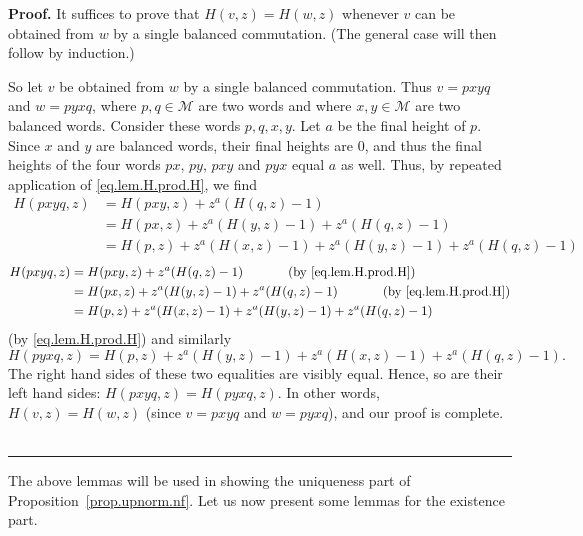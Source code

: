 \documentclass[numbers=enddot,12pt,final,onecolumn,notitlepage]{scrartcl}%
\theoremstyle{definition}
\newenvironment{proof}[1][Proof]{\noindent\textbf{#1.} }{\ \rule{0.5em}{0.5em}}
\newcommand{\M}{\mathcal{M}}
\newenvironment{verlong}{}{}
\newenvironment{vershort}{}{}
\begin{document}
\begin{proof}
It suffices to prove that $H(v, z) = H(w, z)$ whenever $v$ can be obtained from $w$ by a single balanced commutation.
(The general case will then follow by induction.)

So let $v$ be obtained from $w$ by a single balanced commutation.
Thus $v=pxyq$ and $w=pyxq$, where $p,q\in\M$ are two words and where $x,y\in\M$ are two balanced words.
Consider these words $p,q,x,y$.
Let $a$ be the final height of $p$. Since $x$ and $y$ are balanced words, their final heights are $0$, and thus the final heights of the four words $px$, $py$, $pxy$ and $pyx$ equal $a$ as well.
Thus, by repeated application of \eqref{eq.lem.H.prod.H}, we find
\begin{vershort}
\begin{align*}
    H(pxyq, z)
    &= H(pxy, z) + z^a (H(q,z) - 1)
	\\
    &= H(px, z) + z^a (H(y, z) - 1) + z^a (H(q,z) - 1)
	\\
    &= H(p,z) + z^a(H(x,z)-1) + z^a(H(y,z)-1) + z^a(H(q,z)-1)
\end{align*}
\end{vershort}
\begin{verlong}
\begin{align*}
    H(pxyq, z)
    &= H(pxy, z) + z^a (H(q,z) - 1)
	\ \ \ \ \ \ \ \ \ \ \left(\text{by \eqref{eq.lem.H.prod.H}}\right)
	\\
    &= H(px, z) + z^a (H(y, z) - 1) + z^a (H(q,z) - 1)
	\ \ \ \ \ \ \ \ \ \ \left(\text{by \eqref{eq.lem.H.prod.H}}\right)
	\\
    &= H(p,z) + z^a(H(x,z)-1) + z^a(H(y,z)-1) + z^a(H(q,z)-1)
\end{align*}
(by \eqref{eq.lem.H.prod.H})
\end{verlong}
and similarly
\[
H(pyxq,z) = H(p,z) + z^a(H(y,z)-1) + z^a(H(x,z)-1) + z^a(H(q,z)-1).
\]
The right hand sides of these two equalities are visibly equal.
Hence, so are their left hand sides: $H(pxyq,z) = H(pyxq,z)$.
In other words, $H(v,z) = H(w,z)$ (since $v=pxyq$ and $w=pyxq$), and our proof is complete.
\end{proof}

The above lemmas will be used in showing the uniqueness part of Proposition~\ref{prop.upnorm.nf}.
Let us now present some lemmas for the existence part.
\end{document}
